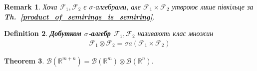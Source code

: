 \documentclass[a4paper, 10pt]{article}
\theoremstyle{theoremdd}
\newtheorem{theorem}{Theorem}[subsection]
\newtheorem{definition}[theorem]{Definition}
\newtheorem{remark}[theorem]{Remark}
\newcommand\thref[1]{\textbf{Th.~\ref{#1}}}
\begin{document}
\begin{remark}
Хоча $\mathcal{F}_1,\mathcal{F}_2$ є $\sigma$-алгебрами, але $\mathcal{F}_1 \times \mathcal{F}_2$ утвроює лише півкільце за \thref{product_of_semirings_is_semiring}.
\end{remark}

\begin{definition}
\textbf{Добутком $\sigma$-алгебр $\mathcal{F}_1,\mathcal{F}_2$} називають клас множин
\begin{align*}
\mathcal{F}_1 \otimes \mathcal{F}_2 = \sigma a(\mathcal{F}_1 \times \mathcal{F}_2)
\end{align*}
\end{definition}

\begin{theorem}
$\mathcal{B}(\mathbb{R}^{m+n}) = \mathcal{B}(\mathbb{R}^m) \otimes \mathcal{B}(\mathbb{R}^n)$.
\end{theorem}
\end{document}
